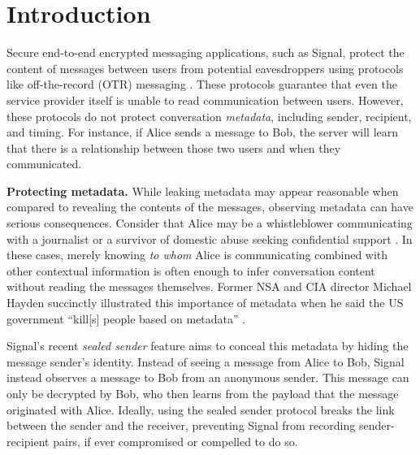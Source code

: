\section{Introduction} %

Secure end-to-end encrypted messaging applications, such as Signal,
protect the content of messages between users from potential eavesdroppers using
protocols like off-the-record (OTR) messaging \cite{BGB04,
DiRaimondo:2005:SOM:1102199.1102216}. These protocols guarantee that even the
service provider itself is unable to read communication between users. However,
these protocols do not protect conversation \emph{metadata}, including sender,
recipient, and timing.  For instance, if Alice sends a message to Bob, the
server will learn that there is a relationship between those two users and when
they communicated.

\medskip
\noindent
\textbf{Protecting metadata.} While leaking metadata may appear reasonable when
compared to revealing the contents of the messages, observing metadata can have
serious consequences. Consider that Alice may be a whistleblower communicating
with a journalist \cite{190976} or a survivor of domestic abuse seeking
confidential support \cite{236244}. In these cases, merely knowing \emph{to
whom} Alice is communicating combined with other contextual information is often
enough to infer conversation content without reading the messages themselves.
Former NSA and CIA director Michael Hayden succinctly illustrated this
importance of metadata when he said the US government ``kill[s] people based on
metadata'' \cite{haydenmetadata}.


Signal's recent \emph{sealed
sender} feature aims to conceal this metadata by hiding the message sender's identity.
Instead of seeing a message from Alice to
Bob, Signal instead observes a message to Bob from an anonymous sender. This message
can only be decrypted by Bob, who then learns from the payload that the message
originated with Alice. Ideally, using the sealed sender protocol breaks the link
between the sender and the receiver, preventing Signal from recording 
sender-recipient pairs, if ever compromised or compelled to do so.

